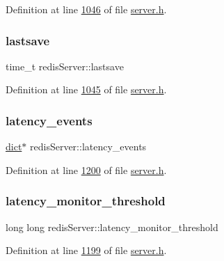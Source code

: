 Definition at line \hyperlink{server_8h_source_l01046}{1046} of file \hyperlink{server_8h_source}{server.\+h}.

\mbox{\label{structredisServer_a16b8cdf645dd6a74c7b3e027f301fe1c}} 
\subsubsection{\texorpdfstring{lastsave}{lastsave}}
{\footnotesize\ttfamily time\+\_\+t redis\+Server\+::lastsave}



Definition at line \hyperlink{server_8h_source_l01045}{1045} of file \hyperlink{server_8h_source}{server.\+h}.

\mbox{\label{structredisServer_ab4f390ac17cafbff19dac064a344ba3a}} 
\subsubsection{\texorpdfstring{latency\+\_\+events}{latency\_events}}
{\footnotesize\ttfamily \hyperlink{structdict}{dict}$\ast$ redis\+Server\+::latency\+\_\+events}



Definition at line \hyperlink{server_8h_source_l01200}{1200} of file \hyperlink{server_8h_source}{server.\+h}.

\mbox{\label{structredisServer_a944799c3b10a71e1332b4ce45ac21828}} 
\subsubsection{\texorpdfstring{latency\+\_\+monitor\+\_\+threshold}{latency\_monitor\_threshold}}
{\footnotesize\ttfamily long long redis\+Server\+::latency\+\_\+monitor\+\_\+threshold}



Definition at line \hyperlink{server_8h_source_l01199}{1199} of file \hyperlink{server_8h_source}{server.\+h}.

